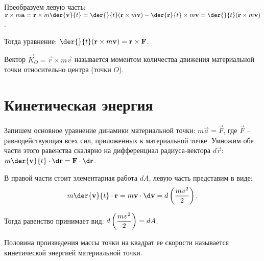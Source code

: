Преобразуем левую часть: \( \ds \vec{r}\times m\vec{a} = \vec{r}\times
m\der{\vec{v}}{t} = \der{}{t}(\vec{r}\times m\vec{v}) - \der{\vec{r}}{t}\times
m\vec{v} = \der{}{t}(\vec{r}\times m\vec{v}) \).

Тогда уравнение:
\( \ds \der{}{t}(\vec{r}\times m\vec{v}) = \vec{r}\times\vec{F} \).

Вектор \( \vec{K}_O = \vec{r}\times m\vec{v} \) называется моментом количества
движения материальной точки относительно центра (точки \( O \)).

\section{Кинетическая энергия}
Запишем основное уравнение динамики материальной точки:
\( m\vec{a} = \vec{F} \), где \( \vec{F} \) -- равнодействующая всех сил,
приложенных к материальной точке. Умножим обе части этого равенства скалярно на
дифференциал радиуса-вектора \( d\vec{r} \):
\( \ds m\der{\vec{v}}{t}\cdot\d\vec{r} = \vec{F}\cdot\d\vec{r} \).

В правой части стоит элементарная работа \( dA \), левую часть представим в
виде:
\[
    m\der{\vec{v}}{t}\cdot\vec{r} = m\vec{v}\cdot\d\vec{v} =
    d\left(\frac{mv^2}{2}\right).
\]
 
Тогда равенство принимает вид: \( \displaystyle d\left( \frac{mv^2}{2}\right) = dA \).

Половина произведения массы точки на квадрат ее скорости называется кинетической
энергией материальной точки.

\newpage
